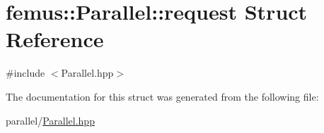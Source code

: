\hypertarget{structfemus_1_1_parallel_1_1request}{}\section{femus\+:\+:Parallel\+:\+:request Struct Reference}
\label{structfemus_1_1_parallel_1_1request}


{\ttfamily \#include $<$Parallel.\+hpp$>$}



The documentation for this struct was generated from the following file\+:\begin{DoxyCompactItemize}
\item 
parallel/\mbox{\hyperlink{_parallel_8hpp}{Parallel.\+hpp}}\end{DoxyCompactItemize}
